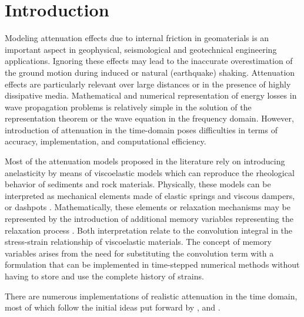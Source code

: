 
\section{Introduction}

Modeling attenuation effects due to internal friction in geomaterials is an important aspect in geophysical, seismological and geotechnical engineering applications. Ignoring these effects may lead to the inaccurate overestimation of the ground motion during induced or natural (earthquake) shaking. Attenuation effects are particularly relevant over large distances or in the presence of highly dissipative media. Mathematical and numerical representation of energy losses in wave propagation problems is relatively simple in the solution of the representation theorem or the wave equation in the frequency domain. However, introduction of attenuation in the time-domain poses difficulties in terms of accuracy, implementation, and computational efficiency.

Most of the attenuation models proposed in the literature rely on introducing anelasticity by means of viscoelastic models which can reproduce the rheological behavior of sediments and rock materials. Physically, these models can be interpreted as mechanical elements made of elastic springs and viscous dampers, or dashpots \citep[e.g.][]{Moczo_2005_GRL}. Mathematically, these elements or relaxation mechanisms may be represented by the introduction of additional memory variables representing the relaxation process \citep[e.g.][]{Day_1984_GJI, Day_2001_BSSA}. Both interpretation relate to the convolution integral in the stress-strain relationship of viscoelastic materials. The concept of memory variables arises from the need for substituting the convolution term with a formulation that can be implemented in time-stepped numerical methods without having to store and use the complete history of strains.

There are numerous implementations of realistic attenuation in the time domain, most of which follow the initial ideas put forward by \citet{Day_1984_GJI}, \citet{Emmerich_1987_G} and \citet{Carcione_1988_GJI}. 